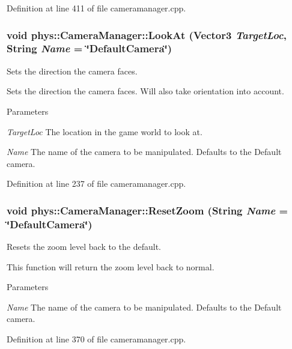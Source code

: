 Definition at line 411 of file cameramanager.cpp.

\hypertarget{classphys_1_1CameraManager_a885a499a53c3543b6bf429583a2cb54c}{
\subsubsection[{LookAt}]{\setlength{\rightskip}{0pt plus 5cm}void phys::CameraManager::LookAt ({\bf Vector3} {\em TargetLoc}, \/  {\bf String} {\em Name} = {\ttfamily \char`\"{}DefaultCamera\char`\"{}})}}
\label{d9/d91/classphys_1_1CameraManager_a885a499a53c3543b6bf429583a2cb54c}


Sets the direction the camera faces. 

Sets the direction the camera faces. Will also take orientation into account. 
\begin{DoxyParams}{Parameters}
\item[{\em TargetLoc}]The location in the game world to look at. \item[{\em Name}]The name of the camera to be manipulated. Defaults to the Default camera. \end{DoxyParams}


Definition at line 237 of file cameramanager.cpp.

\hypertarget{classphys_1_1CameraManager_a1cfaf4720fa9af7c0f234d6a2f26e179}{
\subsubsection[{ResetZoom}]{\setlength{\rightskip}{0pt plus 5cm}void phys::CameraManager::ResetZoom ({\bf String} {\em Name} = {\ttfamily \char`\"{}DefaultCamera\char`\"{}})}}
\label{d9/d91/classphys_1_1CameraManager_a1cfaf4720fa9af7c0f234d6a2f26e179}


Resets the zoom level back to the default. 

This function will return the zoom level back to normal. 
\begin{DoxyParams}{Parameters}
\item[{\em Name}]The name of the camera to be manipulated. Defaults to the Default camera. \end{DoxyParams}


Definition at line 370 of file cameramanager.cpp.

